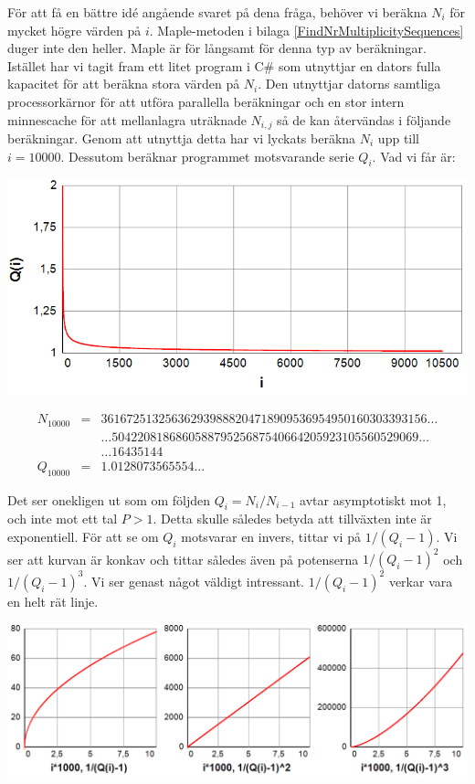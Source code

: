 För att få en bättre idé angående svaret på dena fråga, behöver vi beräkna $N_i$ för mycket högre värden på $i$. Maple-metoden i bilaga \ref{FindNrMultiplicitySequences} duger inte den heller. Maple är för långsamt för denna typ av beräkningar. Istället har vi tagit fram ett litet program i C\# \cite{GitHub} som utnyttjar en dators fulla kapacitet för att beräkna stora värden på $N_i$. Den utnyttjar datorns samtliga processorkärnor för att utföra parallella beräkningar och en stor intern minnescache för att mellanlagra uträknade $N_{i,j}$ så de kan återvändas i följande beräkningar. Genom att utnyttja detta har vi lyckats beräkna $N_i$ upp till $i=10000$. Dessutom beräknar programmet motsvarande serie ${Q_i}$. Vad vi får är:

\begin{center}
\includegraphics[scale=0.5]{Export/Complexity12.png}
\end{center}
\[
\begin{array}{rcl}
N_{10000} & = & 361672513256362939888204718909536954950160303393156\ldots\\
& & \ldots504220818686058879525687540664205923105560529069\ldots\\
& & \ldots16435144\\
Q_{10000} & = & 1.0128073565554...
\end{array}
\]

Det ser onekligen ut som om följden $Q_i=N_i/N_{i-1}$ avtar asymptotiskt mot 1, och inte mot ett tal $P>1$. Detta skulle således betyda att tillväxten inte är exponentiell. För att se om $Q_i$ motsvarar en invers, tittar vi på $1/(Q_i-1)$. Vi ser att kurvan är konkav och tittar således även på potenserna $1/(Q_i-1)^2$ och $1/(Q_i-1)^3$. Vi ser genast något väldigt intressant. $1/(Q_i-1)^2$ verkar vara en helt rät linje.

\begin{center}
\includegraphics[scale=0.5]{Export/Complexity13.png}
\end{center}

